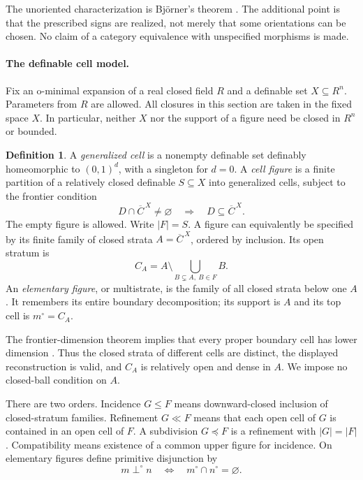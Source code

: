 \documentclass[11pt,a4paper]{article}
\theoremstyle{definition}
\newtheorem{definition}[theorem]{Definition}
\begin{document}
The unoriented characterization is Bj\"orner's theorem \cite[Definition~2.1 and Proposition~3.1]{Bjorner}. The additional point is that the prescribed signs are realized, not merely that some orientations can be chosen. No claim of a category equivalence with unspecified morphisms is made.



\paragraph{The definable cell model.}
Fix an o-minimal expansion of a real closed field $R$ and a definable set $X\subseteq R^n$. Parameters from $R$ are allowed. All closures in this section are taken in the fixed space $X$. In particular, neither $X$ nor the support of a figure need be closed in $R^n$ or bounded.

\begin{definition}
A \emph{generalized cell} is a nonempty definable set definably homeomorphic to $(0,1)^d$, with a singleton for $d=0$. A \emph{cell figure} is a finite partition of a relatively closed definable $S\subseteq X$ into generalized cells, subject to the frontier condition
\[
 D\cap\overline C^{\,X}\ne\varnothing\quad\Longrightarrow\quad D\subseteq\overline C^{\,X}.
\]
The empty figure is allowed. Write $|F|=S$. A figure can equivalently be specified by its finite family of closed strata $A=\overline C^{\,X}$, ordered by inclusion. Its open stratum is
\[
 C_A=A\setminus\bigcup_{B\subsetneq A,\ B\in F}B.
\]
An \emph{elementary figure}, or multistrate, is the family of all closed strata below one $A$. It remembers its entire boundary decomposition; its support is $A$ and its top cell is $m^\circ=C_A$.
\end{definition}
The frontier-dimension theorem implies that every proper boundary cell has lower dimension \cite[Theorem~3.22, pp.~34--35]{Coste}. Thus the closed strata of different cells are distinct, the displayed reconstruction is valid, and $C_A$ is relatively open and dense in $A$. We impose no closed-ball condition on $A$.

There are two orders. Incidence $G\le F$ means downward-closed inclusion of closed-stratum families. Refinement $G\ll F$ means that each open cell of $G$ is contained in an open cell of $F$. A subdivision $G\preceq F$ is a refinement with $|G|=|F|$. Compatibility means existence of a common upper figure for incidence. On elementary figures define primitive disjunction by
\[
 m\perp^\circ n\quad\Longleftrightarrow\quad m^\circ\cap n^\circ=\varnothing.
\]
\end{document}
